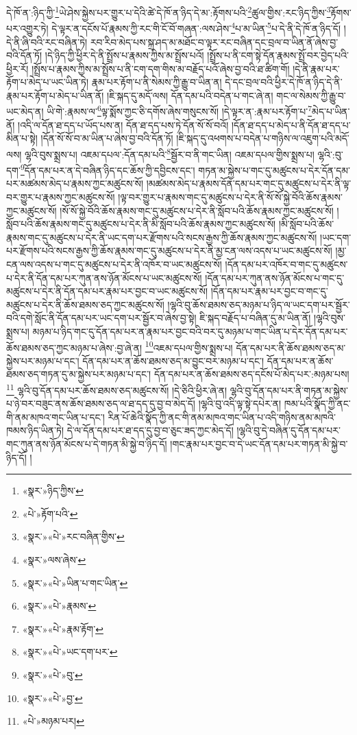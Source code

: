 དེ་ཁོ་ན་:ཉིད་ཀྱི་\footnote{«སྣར་»ཉིད་ཀྱིས་}ཡེ་ཤེས་སྐྱེས་པར་གྱུར་པ་དེའི་ཚེ་དེ་ཁོ་ན་ཉིད་དེ་མ་:རྟོགས་པའི་\footnote{«པེ་»རྟོག་པའི་}ཚུལ་གྱིས་:རང་ཉིད་ཀྱིས་\footnote{«སྣར་»«པེ་»རང་བཞིན་གྱིས་}རྟོགས་པར་འགྱུར་ཏེ། དེ་ལྟར་ན་དངོས་པོ་རྣམས་ཀྱི་རང་གི་ངོ་བོ་གཞན་:ལས་ཤེས་\footnote{«སྣར་»ལས་ཞེས་}པ་མ་ཡིན་\footnote{«སྣར་»«པེ་»ཡིན་པ་གང་ཡིན་}པ་དེ་ནི་དེ་ཁོ་ན་ཉིད་དོ། །དེ་ནི་ཞི་བའི་རང་བཞིན་ཏེ། རབ་རིབ་མེད་པས་སྐྲ་ཤད་མ་མཐོང་བ་ལྟར་རང་བཞིན་དང་བྲལ་བ་ཡིན་ནོ་ཞེས་བྱ་བའི་དོན་ཏོ། །དེ་ཉིད་ཀྱི་ཕྱིར་དེ་ནི་སྤྲོས་པ་རྣམས་ཀྱིས་མ་སྤྲོས་པའོ། །སྤྲོས་པ་ནི་ངག་སྟེ་དོན་རྣམས་སྤྲོ་བར་བྱེད་པའི་ཕྱིར་རོ། །སྤྲོས་པ་རྣམས་ཀྱིས་མ་སྤྲོས་པ་ནི་ངག་དག་གིས་མ་བརྗོད་པའོ་ཞེས་བྱ་བའི་ཐ་ཚིག་གོ། །དེ་ནི་རྣམ་པར་རྟོག་པ་མེད་པ་ཡང་ཡིན་ཏེ། རྣམ་པར་རྟོག་པ་ནི་སེམས་ཀྱི་རྒྱུ་བ་ཡིན་ན། དེ་དང་བྲལ་བའི་ཕྱིར་དེ་ཁོ་ན་ཉིད་དེ་ནི་རྣམ་པར་རྟོག་པ་མེད་པ་ཡིན་ནོ། །ཇི་སྐད་དུ་མདོ་ལས། དོན་དམ་པའི་བདེན་པ་གང་ཞེ་ན། གང་ལ་སེམས་ཀྱི་རྒྱུ་བ་ཡང་མེད་ན། ཡི་གེ་:རྣམས་ལ་\footnote{«སྣར་»«པེ་»རྣམས་}ལྟ་སྨོས་ཀྱང་ཅི་དགོས་ཞེས་གསུངས་སོ། །དེ་ལྟར་ན་:རྣམ་པར་རྟོག་པ་\footnote{«སྣར་»«པེ་»རྣམ་རྟོག་}མེད་པ་ཡིན་ནོ། །འདི་ལ་དོན་ཐ་དད་པ་ཡོད་པས་ན། དོན་ཐ་དད་པས་ཏེ་དོན་སོ་སོ་བའོ། །དོན་ཐ་དད་པ་མེད་པ་ནི་དོན་ཐ་དད་པ་མིན་པ་སྟེ། །དོན་སོ་སོ་བ་མ་ཡིན་པ་ཞེས་བྱ་བའི་དོན་ཏོ། །ཇི་སྐད་དུ་འཕགས་པ་བདེན་པ་གཉིས་ལ་འཇུག་པའི་མདོ་ལས། ལྷའི་བུས་སྨྲས་པ། འཇམ་དཔལ་:དོན་དམ་པའི་\footnote{«སྣར་»«པེ་»ཡང་དག་པར་}སྦྱོར་བ་ནི་གང་ཡིན། འཇམ་དཔལ་གྱིས་སྨྲས་པ། ལྷའི་:བུ་དག་\footnote{«སྣར་»«པེ་»བུ་}དོན་དམ་པར་ན་དེ་བཞིན་ཉིད་དང་ཆོས་ཀྱི་དབྱིངས་དང་། གཏན་མ་སྐྱེས་པ་གང་དུ་མཚུངས་པ་དེར་དོན་དམ་པར་མཚམས་མེད་པ་རྣམས་ཀྱང་མཚུངས་སོ། །མཚམས་མེད་པ་རྣམས་དོན་དམ་པར་གང་དུ་མཚུངས་པ་དེར་ནི་ལྟ་བར་གྱུར་པ་རྣམས་ཀྱང་མཚུངས་སོ། །ལྟ་བར་གྱུར་པ་རྣམས་གང་དུ་མཚུངས་པ་དེར་ནི་སོ་སོ་སྐྱེ་བོའི་ཆོས་རྣམས་ཀྱང་མཚུངས་སོ། །སོ་སོ་སྐྱེ་བོའི་ཆོས་རྣམས་གང་དུ་མཚུངས་པ་དེར་ནི་སློབ་པའི་ཆོས་རྣམས་ཀྱང་མཚུངས་སོ། །སློབ་པའི་ཆོས་རྣམས་གང་དུ་མཚུངས་པ་དེར་ནི་མི་སློབ་པའི་ཆོས་རྣམས་ཀྱང་མཚུངས་སོ། །མི་སློབ་པའི་ཆོས་རྣམས་གང་དུ་མཚུངས་པ་དེར་ནི་ཡང་དག་པར་རྫོགས་པའི་སངས་རྒྱས་ཀྱི་ཆོས་རྣམས་ཀྱང་མཚུངས་སོ། །ཡང་དག་པར་རྫོགས་པའི་སངས་རྒྱས་ཀྱི་ཆོས་རྣམས་གང་དུ་མཚུངས་པ་དེར་ནི་མྱ་ངན་ལས་འདས་པ་ཡང་མཚུངས་སོ། །མྱ་ངན་ལས་འདས་པ་གང་དུ་མཚུངས་པ་དེར་ནི་འཁོར་བ་ཡང་མཚུངས་སོ། །དོན་དམ་པར་འཁོར་བ་གང་དུ་མཚུངས་པ་དེར་ནི་དོན་དམ་པར་ཀུན་ནས་ཉོན་མོངས་པ་ཡང་མཚུངས་སོ། །དོན་དམ་པར་ཀུན་ནས་ཉོན་མོངས་པ་གང་དུ་མཚུངས་པ་དེར་ནི་དོན་དམ་པར་རྣམ་པར་བྱང་བ་ཡང་མཚུངས་སོ། །དོན་དམ་པར་རྣམ་པར་བྱང་བ་གང་དུ་མཚུངས་པ་དེར་ནི་ཆོས་ཐམས་ཅད་ཀྱང་མཚུངས་སོ། །ལྷའི་བུ་ཆོས་ཐམས་ཅད་མཉམ་པ་ཉིད་ལ་ཡང་དག་པར་སྦྱོར་བའི་དགེ་སློང་ནི་དོན་དམ་པར་ཡང་དག་པར་སྦྱོར་བ་ཞེས་བྱ་སྟེ། ཇི་སྐད་བརྗོད་པ་བཞིན་དུ་མ་ཡིན་ནོ། །ལྷའི་བུས་སྨྲས་པ། མཉམ་པ་ཉིད་གང་དུ་དོན་དམ་པར་ན་རྣམ་པར་བྱང་བའི་བར་དུ་མཉམ་པ་གང་ཡིན་པ་དེར་དོན་དམ་པར་ཆོས་ཐམས་ཅད་ཀྱང་མཉམ་པ་ཞེས་:བྱ་ཞེ་ན། \footnote{«སྣར་»«པེ་»བྱ་}འཇམ་དཔལ་གྱིས་སྨྲས་པ། དོན་དམ་པར་ནི་ཆོས་ཐམས་ཅད་མ་སྐྱེས་པར་མཉམ་པ་དང་། དོན་དམ་པར་ན་ཆོས་ཐམས་ཅད་མ་བྱུང་བར་མཉམ་པ་དང་། དོན་དམ་པར་ན་ཆོས་ཐམས་ཅད་གཏན་དུ་མ་སྐྱེས་པར་མཉམ་པ་དང་། དོན་དམ་པར་ན་ཆོས་ཐམས་ཅད་དངོས་པོ་མེད་པར་:མཉམ་པས།\footnote{«པེ་»མཉམ་པར།} ལྷའི་བུ་དོན་དམ་པར་ཆོས་ཐམས་ཅད་མཚུངས་སོ། །དེ་ཅིའི་ཕྱིར་ཞེ་ན། ལྷའི་བུ་དོན་དམ་པར་ནི་གཏན་མ་སྐྱེས་པ་ཉེ་བར་བཟུང་ནས་ཆོས་ཐམས་ཅད་ལ་ཐ་དད་དུ་བྱ་བ་མེད་དོ། །ལྷའི་བུ་འདི་ལྟ་སྟེ་དཔེར་ན། ཁམ་པའི་སྣོད་ཀྱི་ནང་གི་ནམ་མཁའ་གང་ཡིན་པ་དང་། རིན་པོ་ཆེའི་སྣོད་ཀྱི་ནང་གི་ནམ་མཁའ་གང་ཡིན་པ་འདི་གཉིས་ནམ་མཁའི་ཁམས་ཉིད་ཡིན་ཏེ། དེ་ལ་དོན་དམ་པར་ཐ་དད་དུ་བྱ་བ་ཅུང་ཟད་ཀྱང་མེད་དོ། །ལྷའི་བུ་དེ་བཞིན་དུ་དོན་དམ་པར་གང་ཀུན་ནས་ཉོན་མོངས་པ་དེ་གཏན་མི་སྐྱེ་བ་ཉིད་དོ། །གང་རྣམ་པར་བྱང་བ་དེ་ཡང་དོན་དམ་པར་གཏན་མི་སྐྱེ་བ་ཉིད་དོ། །

